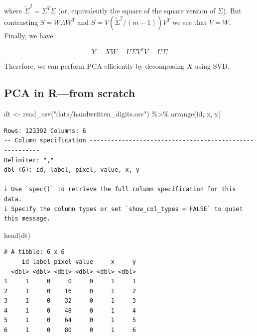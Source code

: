 \documentclass[
  letterpaper,
  DIV=11,
  numbers=noendperiod]{scrreprt}
\newenvironment{Shaded}{\begin{snugshade}}{\end{snugshade}}
\newcommand{\FunctionTok}[1]{\textcolor[rgb]{0.28,0.35,0.67}{#1}}
\newcommand{\NormalTok}[1]{\textcolor[rgb]{0.00,0.23,0.31}{#1}}
\newcommand{\OtherTok}[1]{\textcolor[rgb]{0.00,0.23,0.31}{#1}}
\newcommand{\SpecialCharTok}[1]{\textcolor[rgb]{0.37,0.37,0.37}{#1}}
\newcommand{\StringTok}[1]{\textcolor[rgb]{0.13,0.47,0.30}{#1}}
\begin{document}
where \(\widetilde{\Sigma}^2 = \Sigma^T \Sigma\) (or, equivalently the
square of the square version of \(\Sigma\)). But contrasting
\(S = W \Lambda W^T\) and \(S = V (\widetilde{\Sigma}^2 / (m-1))V^T\) we
see that \(V = W\). Finally, we have:

\[
Y = X W = U \Sigma V^T V = U\Sigma
\]

Therefore, we can perform PCA efficiently by decomposing \(X\) using
SVD.

\hypertarget{pca-in-rfrom-scratch}{%
\subsection{PCA in R---from scratch}\label{pca-in-rfrom-scratch}}

\begin{Shaded}
\begin{Highlighting}[]
\NormalTok{dt }\OtherTok{\textless{}{-}} \FunctionTok{read\_csv}\NormalTok{(}\StringTok{"data/handwritten\_digits.csv"}\NormalTok{) }\SpecialCharTok{\%\textgreater{}\%} 
  \FunctionTok{arrange}\NormalTok{(id, x, y)}
\end{Highlighting}
\end{Shaded}

\begin{verbatim}
Rows: 123392 Columns: 6
-- Column specification --------------------------------------------------------
Delimiter: ","
dbl (6): id, label, pixel, value, x, y

i Use `spec()` to retrieve the full column specification for this data.
i Specify the column types or set `show_col_types = FALSE` to quiet this message.
\end{verbatim}

\begin{Shaded}
\begin{Highlighting}[]
\FunctionTok{head}\NormalTok{(dt)}
\end{Highlighting}
\end{Shaded}

\begin{verbatim}
# A tibble: 6 x 6
     id label pixel value     x     y
  <dbl> <dbl> <dbl> <dbl> <dbl> <dbl>
1     1     0     0     0     1     1
2     1     0    16     0     1     2
3     1     0    32     0     1     3
4     1     0    48     0     1     4
5     1     0    64     0     1     5
6     1     0    80     0     1     6
\end{verbatim}
\end{document}
